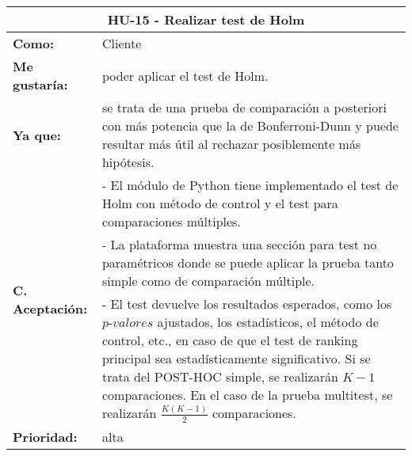 \begin{table}[H]
	\begin{tabular}{| p{3cm}| p{11cm} |}
		\hline
		\multicolumn{2}{|c|}{\textbf{HU-15} - Realizar test de Holm} \\ \hline
		\textbf{Como:} & Cliente \\ \hline
		\textbf{Me gustaría:} & poder aplicar el test de Holm. \\ \hline
		\textbf{Ya que:} & se trata de una prueba de comparación a posteriori con más potencia que la de Bonferroni-Dunn y puede resultar más útil al rechazar posiblemente más hipótesis. \\ \hline
		\multirow{3}{11cm}{\textbf{C. Aceptación:}} & - El módulo de Python tiene implementado el test de Holm con método de control y el test para comparaciones múltiples. \\
		& - La plataforma muestra una sección para test no paramétricos donde se puede aplicar la prueba tanto simple como de comparación múltiple. \\
		& - El test devuelve los resultados esperados, como los $\textit{p-valores}$ ajustados, los estadísticos, el método de control, etc., en caso de que el test de ranking principal sea estadísticamente significativo. Si se trata del POST-HOC simple, se realizarán $K-1$ comparaciones. En el caso de la prueba multitest, se realizarán $\frac{K(K-1)}{2}$ comparaciones. \\ \hline
		\textbf{\textbf{Prioridad:}} & alta \\ \hline
	\end{tabular}
\end{table}


